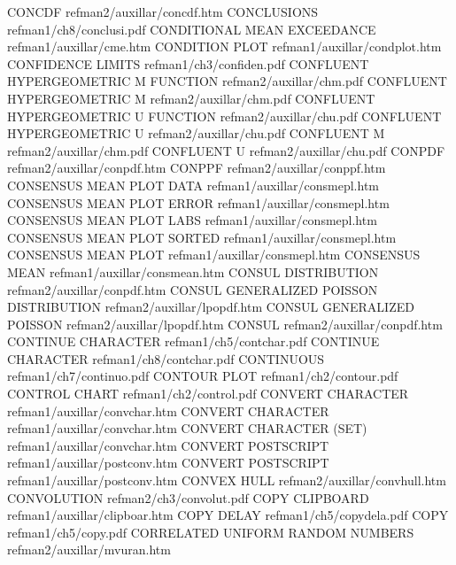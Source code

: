 CONCDF                                  refman2/auxillar/concdf.htm
CONCLUSIONS                             refman1/ch8/conclusi.pdf
CONDITIONAL MEAN EXCEEDANCE             refman1/auxillar/cme.htm
CONDITION PLOT                          refman1/auxillar/condplot.htm
CONFIDENCE LIMITS                       refman1/ch3/confiden.pdf
CONFLUENT HYPERGEOMETRIC M FUNCTION     refman2/auxillar/chm.pdf
CONFLUENT HYPERGEOMETRIC M              refman2/auxillar/chm.pdf
CONFLUENT HYPERGEOMETRIC U FUNCTION     refman2/auxillar/chu.pdf
CONFLUENT HYPERGEOMETRIC U              refman2/auxillar/chu.pdf
CONFLUENT M                             refman2/auxillar/chm.pdf
CONFLUENT U                             refman2/auxillar/chu.pdf
CONPDF                                  refman2/auxillar/conpdf.htm
CONPPF                                  refman2/auxillar/conppf.htm
CONSENSUS MEAN PLOT DATA                refman1/auxillar/consmepl.htm
CONSENSUS MEAN PLOT ERROR               refman1/auxillar/consmepl.htm
CONSENSUS MEAN PLOT LABS                refman1/auxillar/consmepl.htm
CONSENSUS MEAN PLOT SORTED              refman1/auxillar/consmepl.htm
CONSENSUS MEAN PLOT                     refman1/auxillar/consmepl.htm
CONSENSUS MEAN                          refman1/auxillar/consmean.htm
CONSUL DISTRIBUTION                     refman2/auxillar/conpdf.htm
CONSUL GENERALIZED POISSON DISTRIBUTION refman2/auxillar/lpopdf.htm
CONSUL GENERALIZED POISSON              refman2/auxillar/lpopdf.htm
CONSUL                                  refman2/auxillar/conpdf.htm
CONTINUE CHARACTER                      refman1/ch5/contchar.pdf
CONTINUE CHARACTER                      refman1/ch8/contchar.pdf
CONTINUOUS                              refman1/ch7/continuo.pdf
CONTOUR PLOT                            refman1/ch2/contour.pdf
CONTROL CHART                           refman1/ch2/control.pdf
CONVERT CHARACTER                       refman1/auxillar/convchar.htm
CONVERT CHARACTER                       refman1/auxillar/convchar.htm
CONVERT CHARACTER (SET)                 refman1/auxillar/convchar.htm
CONVERT POSTSCRIPT                      refman1/auxillar/postconv.htm
CONVERT POSTSCRIPT                      refman1/auxillar/postconv.htm
CONVEX HULL                             refman2/auxillar/convhull.htm
CONVOLUTION                             refman2/ch3/convolut.pdf
COPY CLIPBOARD                          refman1/auxillar/clipboar.htm
COPY DELAY                              refman1/ch5/copydela.pdf
COPY                                    refman1/ch5/copy.pdf
CORRELATED UNIFORM RANDOM NUMBERS       refman2/auxillar/mvuran.htm
